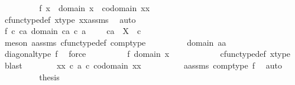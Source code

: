 \begin{isabellebody}
\ \ \ \ \ \ \isamarkupfalse%
\ \isamarkupfalse%
\ f{}{\isacharcolon}{\kern0pt}\ {\isachardoublequoteopen}x\ {\isacharcolon}{\kern0pt}\ domain\ x\ {\isasymrightarrow}\ codomain\ xx{\isachardoublequoteclose}\isanewline
\ \ \ \ \ \ \ \ \isamarkupfalse%
\ cfunc{\isacharunderscore}{\kern0pt}type{\isacharunderscore}{\kern0pt}def\ x{\isacharunderscore}{\kern0pt}type\ xx{\isacharunderscore}{\kern0pt}assms\ \isamarkupfalse%
\ auto\isanewline
\ \ \ \ \ \ \isamarkupfalse%
\ f{}{}{\isacharcolon}{\kern0pt}\ {\isachardoublequoteopen}{\isasymforall}c\ ca{\isachardot}{\kern0pt}\ domain\ {\isacharparenleft}{\kern0pt}ca\ {\isasymcirc}\isactrlsub c\ a{\isacharparenright}{\kern0pt}\ {\isacharequal}{\kern0pt}\ {\isasymone}\ {\isasymor}\ {\isasymnot}\ ca\ {\isacharcolon}{\kern0pt}\ X\ {\isasymrightarrow}\ c{\isachardoublequoteclose}\isanewline
\ \ \ \ \ \ \ \ \isamarkupfalse%
\ {\isacharparenleft}{\kern0pt}meson\ a{\isacharunderscore}{\kern0pt}assms\ cfunc{\isacharunderscore}{\kern0pt}type{\isacharunderscore}{\kern0pt}def\ comp{\isacharunderscore}{\kern0pt}type{\isacharparenright}{\kern0pt}\isanewline
\ \ \ \ \ \ \isamarkupfalse%
\ \isamarkupfalse%
\ {\isachardoublequoteopen}domain\ {\isasymlangle}a{\isacharcomma}{\kern0pt}a{\isasymrangle}\ {\isacharequal}{\kern0pt}\ {\isasymone}{\isachardoublequoteclose}\isanewline
\ \ \ \ \ \ \ \ \isamarkupfalse%
\ diagonal{\isacharunderscore}{\kern0pt}type\ f{}\ \isamarkupfalse%
\ force\isanewline
\ \ \ \ \ \ \isamarkupfalse%
\ \isamarkupfalse%
\ f{}{}{\isacharcolon}{\kern0pt}\ {\isachardoublequoteopen}domain\ x\ {\isacharequal}{\kern0pt}\ {\isasymone}{\isachardoublequoteclose}\isanewline
\ \ \ \ \ \ \ \ \isamarkupfalse%
\ cfunc{\isacharunderscore}{\kern0pt}type{\isacharunderscore}{\kern0pt}def\ x{\isacharunderscore}{\kern0pt}type\ \isamarkupfalse%
\ blast\isanewline
\ \ \ \ \ \ \isamarkupfalse%
\ {\isachardoublequoteopen}xx\ {\isasymcirc}\isactrlsub c\ a\ {\isasymin}\isactrlsub c\ codomain\ xx{\isachardoublequoteclose}\isanewline
\ \ \ \ \ \ \ \ \isamarkupfalse%
\ a{\isacharunderscore}{\kern0pt}assms\ comp{\isacharunderscore}{\kern0pt}type\ f{}\ \isamarkupfalse%
\ auto\isanewline
\ \ \ \ \ \ \isamarkupfalse%
\ \isamarkupfalse%
\ {\isacharquery}{\kern0pt}thesis\isanewline

\end{isabellebody}
